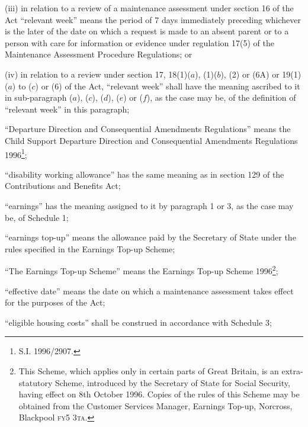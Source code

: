 \documentclass[a4paper]{article}
\begin{document}
\begin{enumerate}
\begin{enumerate}
(iii) in relation to a review of a maintenance assessment under section 16 of the Act “relevant week” means the period of 7 days immediately preceding whichever is the later of the date on which a request is made to an absent parent or to a person with care for information or evidence under regulation 17(5) of the Maintenance Assessment Procedure Regulations; or

(iv) in relation to a review under section 17, 18(1)($a$), (1)($b$), (2) or (6A) or 19(1)($a$) to ($c$) or (6) of the Act, “relevant week” shall have the meaning ascribed to it in sub-paragraph ($a$), ($c$), ($d$), ($e$) or ($f$), as the case may be, of the definition of “relevant week” in this paragraph;
\end{enumerate}

\begin{sloppypar}
“Departure Direction and Consequential Amendments Regulations” means the Child
Support Departure Direction and Consequential Amendments Regulations 1996\footnote{\frenchspacing S.I. 1996/2907.};
\end{sloppypar}

“disability working allowance” has the same meaning as in section 129 of the Contributions and Benefits Act;

“earnings” has the meaning assigned to it by paragraph 1 or 3, as the case may be, of Schedule 1;

“earnings top-up” means the allowance paid by the Secretary of State under the rules specified in the Earnings Top-up Scheme;

“The Earnings Top-up Scheme” means the Earnings Top-up Scheme 1996\footnote{\frenchspacing This Scheme, which applies only in certain parts of Great Britain, is an extra-statutory Scheme, introduced by the Secretary of State for Social Security, having effect on 8th October 1996. Copies of the rules of this Scheme may be obtained from the Customer Services Manager, Earnings Top-up, Norcross, Blackpool \textsc{fy5 3ta}.};

“effective date” means the date on which a maintenance assessment takes effect for the purposes of the Act;

“eligible housing costs” shall be construed in accordance with Schedule 3;


\end{enumerate}
\end{document}
